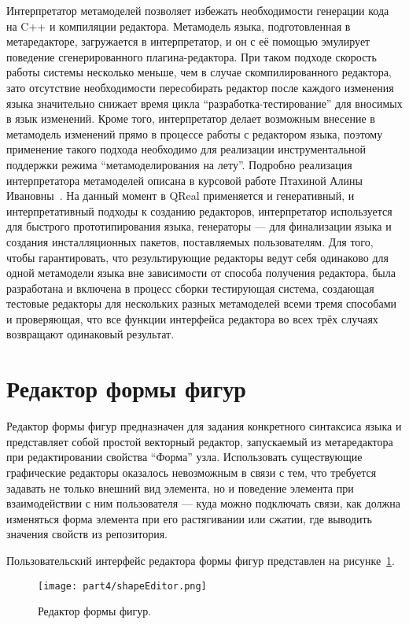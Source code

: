 Интерпретатор метамоделей позволяет избежать необходимости генерации кода на C++ и 
компиляции редактора. Метамодель языка, подготовленная в метаредакторе, загружается 
в интерпретатор, и он с её помощью эмулирует поведение сгенерированного плагина-редактора. 
При таком подходе скорость работы системы несколько меньше, чем в случае скомпилированного 
редактора, зато отсутствие необходимости пересобирать редактор после каждого изменения 
языка значительно снижает время цикла "`разработка-тестирование"' для вносимых в язык 
изменений. Кроме того, интерпретатор делает возможным внесение в метамодель изменений 
прямо в процессе работы с редактором языка, поэтому применение такого подхода необходимо 
для реализации инструментальной поддержки режима "`метамоделирования на лету"'. Подробно 
реализация интерпретатора метамоделей описана в курсовой работе Птахиной Алины Ивановны~\cite{ptakhina2012course}.
На данный момент в QReal применяется и генеративный, и интерпретативный подходы к 
созданию редакторов, интерпретатор используется для быстрого прототипирования языка, 
генераторы --- для финализации языка и создания инсталляционных пакетов, поставляемых 
пользователям. Для того, чтобы гарантировать, что результирующие редакторы ведут себя 
одинаково для одной метамодели языка вне зависимости от способа получения редактора, 
была разработана и включена в процесс сборки тестирующая система, создающая тестовые 
редакторы для нескольких разных метамоделей всеми тремя способами и проверяющая, что 
все функции интерфейса редактора во всех трёх случаях возвращают одинаковый результат.

\section{Редактор формы фигур}
Редактор формы фигур предназначен для задания конкретного синтаксиса языка и представляет 
собой простой векторный редактор, запускаемый из метаредактора при редактировании свойства 
"`Форма"' узла. Использовать существующие графические редакторы оказалось невозможным 
в связи с тем, что требуется задавать не только внешний вид элемента, но и поведение 
элемента при взаимодействии с ним пользователя --- куда можно подключать связи, как 
должна изменяться форма элемента при его растягивании или сжатии, где выводить значения 
свойств из репозитория.

Пользовательский интерфейс редактора формы фигур представлен на рисунке~\ref{image:shapeEditor}.

\begin{figure} [ht]
	\begin{center}
		\texttt{[image: part4/shapeEditor.png]}
		\caption{Редактор формы фигур.}
		\label{image:shapeEditor}
	\end{center}
\end{figure}

